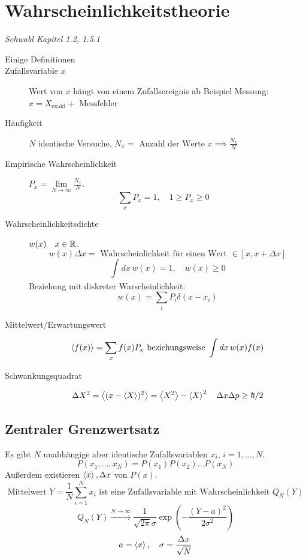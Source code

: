 \section{Wahrscheinlichkeitstheorie}
\emph{Schwabl Kapitel 1.2, 1.5.1} \\
\begin{description}
  \item [Einige Definitionen]

  \item [Zufallsvariable $x$] Wert von $x$ h\"angt von einem Zufallsereignis ab
    Beispiel Messung: $x= X_{\text{exakt}} + \text{ Messfehler }$

  \item[H\"aufigkeit] 
    $N$ identische Versuche, $N_x = \text{ Anzahl der Werte } x \implies \frac{N_x}{N}$

  \item[Empirische Wahrscheinlichkeit]
    $P_x = \lim\limits_{N \to \infty } \frac{N_x}{N}$.
    \[ \sum_{x}{} P_x = 1 , \quad 1 \ge P_x \ge 0 \quad \] 

  \item[Wahrscheinlichkeitsdichte] 
    $w(x) \quad x \in \mathbb{R}$. \[ w(x)\Delta x = \text{ Wahrscheinlichkeit f\"ur einen
      Wert } \in [x, x+\Delta x]  \] 
      \[ \int_{}^{}dx\, w(x)=1, \quad w(x)\ge 0 \] 
      Beziehung mit diskreter Warscheinlichkeit: 
      \[ w(x) = \sum_{i}{}P_i \delta ( x-x_i) \] 

  \item[Mittelwert/Erwartungswert]
    \[ \Braket{f(x)} = \sum_{x}{} f(x) P_x \text{ beziehungsweise } \int_{}^{}
      dx\, w(x) f(x)\] 

  \item [Schwankungsquadrat] \[ \Delta X^2 = \Braket{(x-\Braket{X})^2}
    = \Braket{X^2}- \Braket{X}^2 \quad \Delta x \Delta p \ge \hbar/2\] 
\end{description}
\subsection{Zentraler Grenzwertsatz}
Es gibt $N$ unabh\"angige aber identische Zufallsvariablen $x_i, \, i=1 , \dotsc , N$.
\[ P(x_1,\dotsc,x_N)= P(x_1) P(x_2) \ldots P(x_N)  \]
Au\ss{}erdem existieren $\Braket{x},\Delta x$ von  $P(x)$.
\[ \text{Mittelwert } Y= \frac{1}{N}\sum_{i=1}^{N}x_i  \text{ ist eine
Zufallsvariable mit Wahrscheinlichkeit } Q_N(Y) \] 
\[ Q_N(Y) \xrightarrow{N\to \infty}\frac{1}{\sqrt{2 \pi} \sigma}
\exp{(-\frac{(Y-a)^2}{2 \sigma^2})}\] 
\[ a=\Braket{x}, \quad \sigma= \frac{\Delta x}{ \sqrt{N}} \] 


